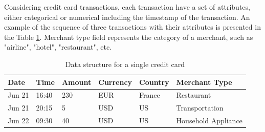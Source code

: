 \documentclass{article}
\begin{document}
Considering credit card transactions, each transaction have a set of attributes, either categorical or numerical including the timestamp of the transaction. An example of the sequence of three transactions with their attributes is presented in the Table \ref{tab-tr-data}.
Merchant type field represents the category of a merchant, such as "airline", "hotel", "restaurant", etc.

\begin{table}
\centering
\caption{Data structure for a single credit card}
\begin{tabular}{llllll}
\toprule
\textbf{Date} & \textbf{Time} & \textbf{Amount} & \textbf{Currency} & \textbf{Country} & \textbf{Merchant Type} \\
\midrule
Jun 21 & 16:40& 230 & EUR & France & Restaurant \\
Jun 21 & 20:15 & 5 & USD & US & Transportation \\
Jun 22 & 09:30 & 40 & USD & US & Household Appliance \\
\bottomrule
\end{tabular}
\label{tab-tr-data}
\end{table}


\end{document}
